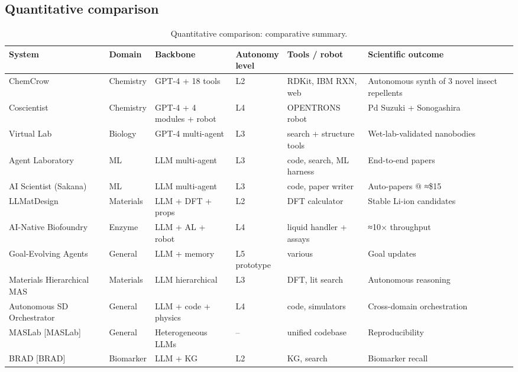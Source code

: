 \documentclass{article}
\begin{document}
\subsection{Quantitative comparison}\label{quantitative-comparison}

\begin{table}[t]
\centering
\caption{Quantitative comparison: comparative summary.}
\label{tab:quantitative-comparison}
\begin{tabular}{>{\raggedright\arraybackslash}p{0.2095\linewidth}
  >{\raggedright\arraybackslash}p{0.0608\linewidth}
  >{\raggedright\arraybackslash}p{0.1689\linewidth}
  >{\raggedright\arraybackslash}p{0.0946\linewidth}
  >{\raggedright\arraybackslash}p{0.1622\linewidth}
  >{\raggedright\arraybackslash}p{0.3041\linewidth}}
\toprule
System & Domain & Backbone & Autonomy level & Tools / robot & Scientific outcome \\
\midrule
ChemCrow \cite{bran2024naturemachineintel} & Chemistry & GPT-4 + 18 tools & L2 & RDKit, IBM RXN, web & Autonomous synth of 3 novel insect repellents \\
Coscientist \cite{boiko2023nature6242023} & Chemistry & GPT-4 + 4 modules + robot & L4 & OPENTRONS robot & Pd Suzuki + Sonogashira \\
Virtual Lab \cite{swanson2024thevirtuallabaiage} & Biology & GPT-4 multi-agent & L3 & search + structure tools & Wet-lab-validated nanobodies \\
Agent Laboratory \cite{schmidgall2025agentlaboratoryusi} & ML & LLM multi-agent & L3 & code, search, ML harness & End-to-end papers \\
AI Scientist (Sakana) & ML & LLM multi-agent & L3 & code, paper writer & Auto-papers @ ≈\$15 \\
LLMatDesign \cite{jia2024arxiv2406131632024} & Materials & LLM + DFT + props & L2 & DFT calculator & Stable Li-ion candidates \\
AI-Native Biofoundry \cite{zhang2026anainativebiofound} & Enzyme & LLM + AL + robot & L4 & liquid handler + assays & ≈10× throughput \\
Goal-Evolving Agents \cite{du2025acceleratingscient} & General & LLM + memory & L5 prototype & various & Goal updates \\
Materials Hierarchical MAS \cite{rothfarb2025hierarchicalmultia} & Materials & LLM hierarchical & L3 & DFT, lit search & Autonomous reasoning \\
Autonomous SD Orchestrator \cite{zhou2025autonomousagentsfo} & General & LLM + code + physics & L4 & code, simulators & Cross-domain orchestration \\
MASLab {[}MASLab{]} & General & Heterogeneous LLMs & -- & unified codebase & Reproducibility \\
BRAD {[}BRAD{]} & Biomarker & LLM + KG & L2 & KG, search & Biomarker recall \\
\end{tabular}
\end{table}
\end{document}
